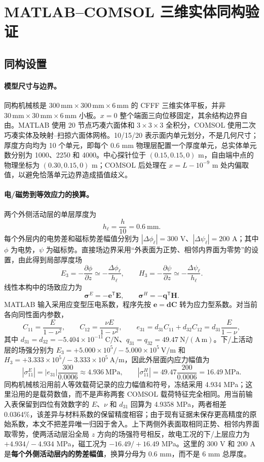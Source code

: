 \documentclass[UTF8,fontset=windows,11pt,a4paper]{ctexart}
\begin{document}
\section{MATLAB--COMSOL 三维实体同构验证}

\subsection{同构设置}

\paragraph{模型尺寸与边界。}
同构机械核是 $300\,\mathrm{mm}\times300\,\mathrm{mm}\times6\,\mathrm{mm}$ 的 CFFF 三维实体平板，并非 $30\,\mathrm{mm}\times30\,\mathrm{mm}\times6\,\mathrm{mm}$ 小板。$x=0$ 整个端面三向位移固定，其余结构边界自由。MATLAB 使用 20 节点巧凑六面体和 $3\times3\times3$ 全积分，COMSOL 使用二次巧凑实体及映射--扫掠六面体网格。10/15/20 表示面内单元划分，不是几何尺寸；厚度方向均为 10 个单元，即每个 0.6 mm 物理层配置一个厚度单元，总实体单元数分别为 1000、2250 和 4000。中心探针位于 $(0.15,0.15,0)$ m，自由端中点的物理坐标为 $(0.30,0.15,0)$ m；COMSOL 后处理在 $x=L-10^{-9}$ m 处内偏取值，以避免恰落单元边界造成插值歧义。

\paragraph{电/磁势到等效应力的换算。}
两个外侧活动层的单层厚度为
\[
h_{\ell}=\frac{h}{10}=0.6\ \mathrm{mm}.
\]
每个外层内的电势差和磁标势差幅值分别为 $|\Delta\phi_{\ell}|=300$ V、$|\Delta\psi_{\ell}|=200$ A；其中 $\phi$ 为电势，$\psi$ 为磁标势。直接场边界采用“外表面为正势、相邻内界面为零势”的设置，由此得到局部厚度场
\[
E_3=-\frac{\partial\phi}{\partial z}\simeq-\frac{\Delta\phi_{\ell}}{h_{\ell}},
\qquad
H_3=-\frac{\partial\psi}{\partial z}\simeq-\frac{\Delta\psi_{\ell}}{h_{\ell}}.
\]
线性本构中的场致应力为
\[
\boldsymbol\sigma^{E}=-\mathbf e^{\mathsf T}\mathbf E,
\qquad
\boldsymbol\sigma^{H}=-\mathbf q^{\mathsf T}\mathbf H.
\]
MATLAB 输入采用应变型压电系数，程序先按 $\mathbf e=\mathbf d\mathbf C$ 转为应力型系数。对当前各向同性面内参数，
\[
C_{11}=\frac{E}{1-\nu^2},\qquad
C_{12}=\frac{\nu E}{1-\nu^2},\qquad
e_{31}=d_{31}C_{11}+d_{32}C_{12}
=d_{31}\frac{E}{1-\nu},
\]
其中 $d_{31}=d_{32}=-5.404\times10^{-11}\ \mathrm{C/N}$、$q_{31}=q_{32}=49.47\ \mathrm{N/(A\,m)}$。下/上活动层的场强分别为 $E_3=+5.000\times10^5/-5.000\times10^5\ \mathrm{V/m}$ 和 $H_3=+3.333\times10^5/-3.333\times10^5\ \mathrm{A/m}$，因此外层面内应力幅值为
\[
|\sigma^{E}_{11}|=|e_{31}|\frac{300}{0.0006}\approx4.936\ \mathrm{MPa},
\qquad
|\sigma^{H}_{11}|=49.47\frac{200}{0.0006}=16.49\ \mathrm{MPa}.
\]
同构机械核沿用前人等效载荷记录的应力幅值和符号，冻结采用 4.934 MPa；这里沿用的是载荷数值，而不是声称两套 COMSOL 载荷特征完全相同。用当前输入表保留到四位有效数字的 $E$、$\nu$ 和 $d_{31}$ 回算为 4.9358 MPa，两者相差 0.0364\%，该差异与材料系数的保留精度相容；由于现有证据未保存更高精度的原始系数，本文不把差异唯一归因于舍入。上下两侧外表面取相同正势、相邻内界面取零势，使两活动层沿全局 $z$ 方向的场强符号相反，故电工况的下/上层应力为 $+4.934/-4.934$ MPa，磁工况为 $-16.49/+16.49$ MPa。这里的 300 V 和 200 A 是\textbf{每个外侧活动层内的势差幅值}，换算分母为 0.6 mm，而不是 6 mm 总厚度。
\end{document}
